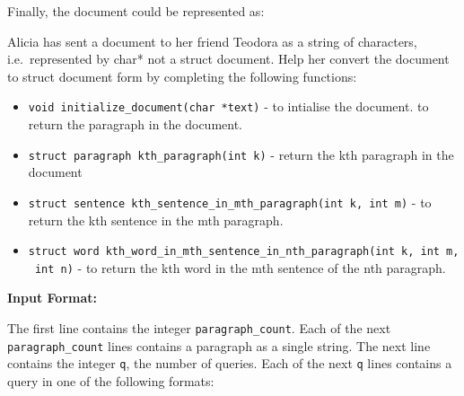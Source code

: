 Finally, the document could be represented as:

\begin{Shaded}
\begin{Highlighting}[]
\OperatorTok{;}

\OperatorTok{=} \OperatorTok{\{\{\{}\OperatorTok{,} \OperatorTok{,} \OperatorTok{,} \OperatorTok{\}\},} \OperatorTok{\{\{}\OperatorTok{,} \OperatorTok{,} \OperatorTok{,} \OperatorTok{,} \OperatorTok{\},} \OperatorTok{\{}\OperatorTok{,} \OperatorTok{,} \OperatorTok{,} \OperatorTok{,} \OperatorTok{,} \OperatorTok{\}\}\};}
\end{Highlighting}
\end{Shaded}

Alicia has sent a document to her friend Teodora as a string of
characters, i.e.~represented by char* not a struct document. Help her
convert the document to struct document form by completing the following
functions:

\begin{itemize}
\tightlist
\item
  \texttt{void\ initialize\_document(char\ *text)} - to intialise the
  document. to return the paragraph in the document.
\item
  \texttt{struct\ paragraph\ kth\_paragraph(int\ k)} - return the kth
  paragraph in the document
\item
  \texttt{struct\ sentence\ kth\_sentence\_in\_mth\_paragraph(int\ k,\ int\ m)}
  - to return the kth sentence in the mth paragraph.
\item
  \texttt{struct\ word\ kth\_word\_in\_mth\_sentence\_in\_nth\_paragraph(int\ k,\ int\ m,\ int\ n)}
  - to return the kth word in the mth sentence of the nth paragraph.
\end{itemize}

\textbf{Input Format:}

The first line contains the integer \texttt{paragraph\_count}. Each of
the next \texttt{paragraph\_count} lines contains a paragraph as a
single string. The next line contains the integer \texttt{q}, the number
of queries. Each of the next \texttt{q} lines contains a query in one of
the following formats:

